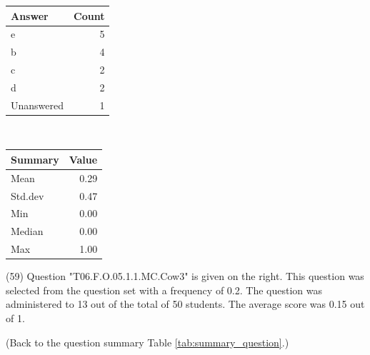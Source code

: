 \documentclass[12pt,english,nohyper]{tufte-handout}\usepackage[]{graphicx}\usepackage[]{color}
\begin{document}
\begin{center}%
\begin{tabular}{lr}
  \hline
Answer & Count \\ 
  \hline
e &   5 \\ 
  b &   4 \\ 
  c &   2 \\ 
  d &   2 \\ 
  Unanswered &   1 \\ 
   \hline
\end{tabular}
~~~~~~~~%
\begin{tabular}{lr}
  \hline
Summary & Value \\ 
  \hline
Mean & 0.29 \\ 
  Std.dev & 0.47 \\ 
  Min & 0.00 \\ 
  Median & 0.00 \\ 
  Max & 1.00 \\ 
   \hline
\end{tabular}
\end{center}\newpage{} (59) Question "T06.F.O.05.1.1.MC.Cow3" is given on the right. This question was selected from the question set with a frequency of 0.2. The question was administered to 13 out of the total of 50 students. The average score was 0.15 out of 1.

 (Back to the question summary Table \ref{tab:summary_question}.)
\end{document}
